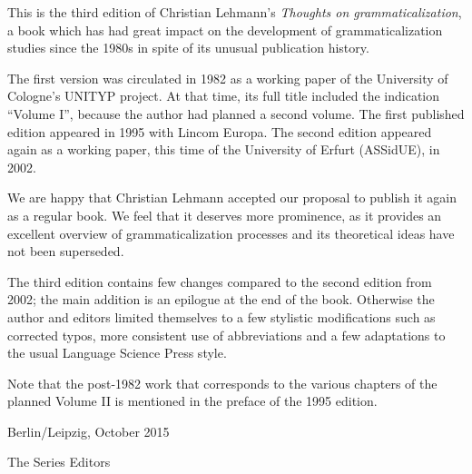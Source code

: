 
This is the third edition of Christian Lehmann’s \textit{Thoughts on grammaticalization}, a book which has had great impact on the development of grammaticalization studies since the 1980s in spite of its unusual publication history.

The first version was circulated in 1982 as a working paper of the University of Cologne’s UNITYP project. At that time, its full title included the indication ``Volume I'', because the author had planned a second volume. The first published edition appeared in 1995 with Lincom Europa. The second edition appeared again as a working paper, this time of the University of Erfurt (ASSidUE), in 2002.

We are happy that Christian Lehmann accepted our proposal to publish it again as a regular book. We feel that it deserves more prominence, as it provides an excellent overview of grammaticalization processes and its theoretical ideas have not been superseded.

The third edition contains few changes compared to the second edition from 2002; the main addition is an epilogue at the end of the book. Otherwise the author and editors limited themselves to a few stylistic modifications such as corrected typos, more consistent use of abbreviations and a few adaptations to the usual Language Science Press style.

Note that the post-1982 work that corresponds to the various chapters of the planned Volume II is mentioned in the preface of the 1995 edition.

\vspace{\baselineskip}
\begin{minipage}{.45\linewidth}
	\begin{flushleft}
		\noindent Berlin/Leipzig, October 2015  
	\end{flushleft}
\end{minipage}
\begin{minipage}{.45\linewidth}
	\begin{flushright}
		The Series Editors
	\end{flushright}
\end{minipage}                